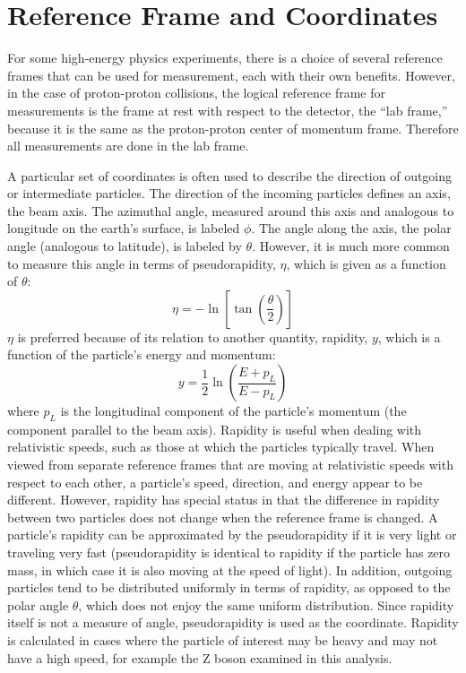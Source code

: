 \section{Reference Frame and Coordinates}


For some high-energy physics experiments, 
there is a choice of several reference 
frames that can be used for measurement, 
each with their own benefits.  
However, in the case of proton-proton collisions, 
the logical reference frame for measurements is 
the frame at rest with respect to the detector, 
the ``lab frame,'' 
because it is the same as the 
proton-proton center of momentum frame.  
Therefore all measurements are done 
in the lab frame.  



A particular set of coordinates is often used to describe 
the direction of outgoing or intermediate particles.  
The direction of the incoming particles defines an axis, 
the beam axis.  
The azimuthal angle, measured around this axis 
and analogous to longitude on the earth's surface, 
is labeled $\phi$.  
The angle along the axis, the polar angle 
(analogous to latitude), 
is labeled by $\theta$.  
However, it is much more common to measure this 
angle in terms of pseudorapidity, $\eta$, 
which is given as a function of $\theta$:
\[
\eta = -\ln \left[ \tan \left( \frac{\theta}{2}\right) \right]
\]
$\eta$ is preferred because of its relation to another quantity, 
rapidity, $y$, which is a function of the particle's 
energy and momentum:
\[
y = \frac{1}{2} \ln \left( \frac{E+p_L}{E-p_L} \right)
\]
where $p_L$ is the longitudinal component of the 
particle's momentum (the component parallel to the beam axis).  
Rapidity is useful when dealing with relativistic speeds, 
such as those at which the particles typically travel.  
When viewed from separate reference frames that are moving 
at relativistic speeds with respect to each other, 
a particle's speed, direction, and energy appear to be different.  
However, rapidity has special status in that the 
difference in rapidity 
between two particles does not change 
when the reference frame is changed.  
A particle's rapidity can be approximated by the 
pseudorapidity if it is very light or 
traveling very fast 
(pseudorapidity is identical to rapidity 
if the particle has zero mass, 
in which case it is also 
moving at the speed of light).  
In addition, outgoing particles tend to be 
distributed uniformly in terms of rapidity, 
as opposed to the polar angle $\theta$, 
which does not enjoy the same uniform distribution. 
Since rapidity itself is not a measure of angle, 
pseudorapidity is used as the coordinate.  
Rapidity is calculated in cases 
where the particle of interest may be heavy 
and may not have a high speed, 
for example the Z boson examined in this analysis.  

